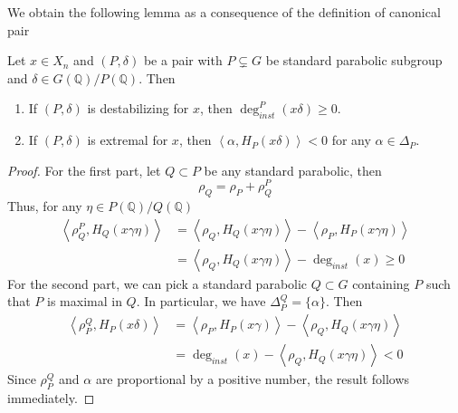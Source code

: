 We obtain the following lemma as a consequence of the definition of canonical pair
\begin{lemma}\label{canonical-pair}
    Let $x \in X_n$  and $(P,\delta)$ be a pair with $P \subsetneq G$ be standard parabolic subgroup and
    $\delta \in G(\mathbb{Q})/P(\mathbb{Q})$. Then
    \begin{enumerate}
        \item If $(P,\delta)$ is destabilizing for $x$, then $\deg_{inst}^P(x\delta) \ge 0$.
        \item If $(P,\delta) $ is extremal for $x$, then $\left\langle \alpha, H_P(x\delta)\right\rangle <0$ for any $\alpha \in \Delta_P$.
    \end{enumerate}
\end{lemma}
\begin{proof}
    For the first part, let $Q \subset P$ be any standard parabolic, then
    \[\rho_Q = \rho_P + \rho_Q^P\]
    Thus, for any $\eta \in P(\mathbb{Q})/Q(\mathbb{Q})$
    \begin{align*}
        \left\langle \rho_Q^P,H_Q(x\gamma\eta)\right\rangle & = \left\langle\rho_Q,H_Q(x\gamma\eta)\right\rangle - \left\langle\rho_P,H_P(x\gamma\eta)\right\rangle \\                                                 & = \left\langle\rho_Q,H_Q(x\gamma\eta)\right\rangle -\deg_{inst}(x) \ge 0
    \end{align*}
    For the second part, we can pick a standard parabolic $Q \subset G$ containing $P$ such that $P$ is maximal in $Q$. In particular, we have
    $\Delta^{Q}_P = \{\alpha\}$. Then
    \begin{align*}
        \left\langle\rho_P^Q,H_P(x\delta)\right\rangle & = \left\langle\rho_P,H_P(x\gamma)\right\rangle - \left\langle\rho_Q,H_Q(x\gamma\eta)\right\rangle \\
                                                       & = \deg_{inst}(x) - \left\langle\rho_Q,H_Q(x\gamma\eta)\right\rangle <0
    \end{align*}
    Since $\rho_P^Q$ and $\alpha$ are proportional by a positive number, the result follows immediately.\end{proof}
